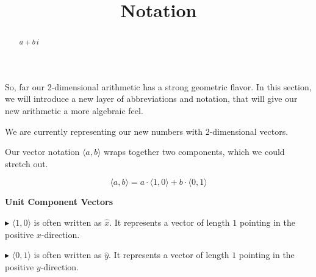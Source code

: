 \documentclass{ximera}
\title{Notation}
\begin{document}
\begin{abstract}
$a + b \, i$
\end{abstract}
\maketitle


So, far our 2-dimensional arithmetic has a strong geometric flavor.  In this section, we will introduce a new layer of abbreviations and notation, that will give our new arithmetic a more algebraic feel. 


We are currently representing our new numbers with 2-dimensional vectors.

\begin{image}
\end{image}



Our vector notation $\langle a, b \rangle$ wraps together two components, which we could stretch out.

\[    \langle a, b \rangle = a \cdot \langle 1, 0 \rangle + b \cdot \langle 0, 1 \rangle            \]


\begin{notation} \textbf{\textcolor{red!50!green}{Unit Component Vectors}}  

$\blacktriangleright$ $\langle 1, 0 \rangle$ is often written as $\hat{x}$. It represents a vector of length $1$ pointing in the positive $x$-direction.

$\blacktriangleright$ $\langle 0, 1 \rangle$ is often written as $\hat{y}$. It represents a vector of length $1$ pointing in the positive $y$-direction.

\end{notation}
\end{document}
